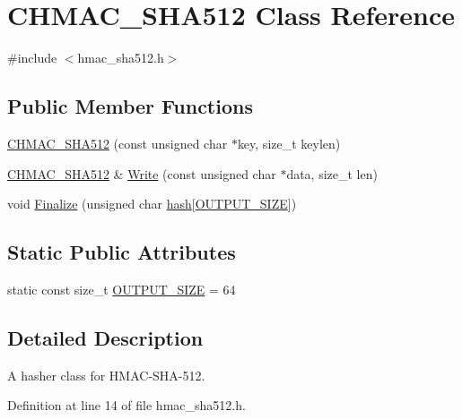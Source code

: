 \hypertarget{class_c_h_m_a_c___s_h_a512}{}\section{C\+H\+M\+A\+C\+\_\+\+S\+H\+A512 Class Reference}
\label{class_c_h_m_a_c___s_h_a512}


{\ttfamily \#include $<$hmac\+\_\+sha512.\+h$>$}

\subsection*{Public Member Functions}
\begin{DoxyCompactItemize}
\item 
\hyperlink{class_c_h_m_a_c___s_h_a512_a03e1288c20422f66b7e732aafda804e5}{C\+H\+M\+A\+C\+\_\+\+S\+H\+A512} (const unsigned char $\ast$key, size\+\_\+t keylen)
\item 
\hyperlink{class_c_h_m_a_c___s_h_a512}{C\+H\+M\+A\+C\+\_\+\+S\+H\+A512} \& \hyperlink{class_c_h_m_a_c___s_h_a512_aefdf2b068b668027b67c8822227a5a18}{Write} (const unsigned char $\ast$data, size\+\_\+t len)
\item 
void \hyperlink{class_c_h_m_a_c___s_h_a512_a3042ed5129bd381eb18ed2da201d6ed5}{Finalize} (unsigned char \hyperlink{cache_8cc_a11ecb029164e055f28f4123ce3748862}{hash}\mbox{[}\hyperlink{class_c_h_m_a_c___s_h_a512_a3baae67a0cf9702e18fff8f4f7ae05b6}{O\+U\+T\+P\+U\+T\+\_\+\+S\+I\+Z\+E}\mbox{]})
\end{DoxyCompactItemize}
\subsection*{Static Public Attributes}
\begin{DoxyCompactItemize}
\item 
static const size\+\_\+t \hyperlink{class_c_h_m_a_c___s_h_a512_a3baae67a0cf9702e18fff8f4f7ae05b6}{O\+U\+T\+P\+U\+T\+\_\+\+S\+I\+Z\+E} = 64
\end{DoxyCompactItemize}


\subsection{Detailed Description}
A hasher class for H\+M\+A\+C-\/\+S\+H\+A-\/512. 

Definition at line 14 of file hmac\+\_\+sha512.\+h.



